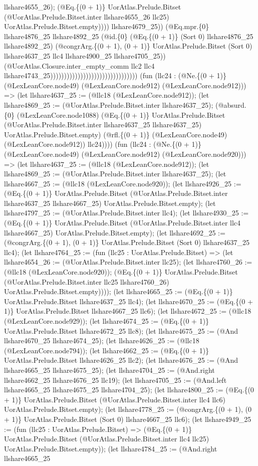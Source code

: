 \documentclass[11pt]{article}
\begin{document}
llshare4655\_26); (@Eq.\{(0 + 1)\} UorAtlas.Prelude.Bitset (@UorAtlas.Prelude.Bitset.inter llshare4655\_26 llc25) UorAtlas.Prelude.Bitset.empty)))) llshare4679\_25)) (@Eq.mpr.\{0\} llshare4876\_25 llshare4892\_25 (@id.\{0\} (@Eq.\{(0 + 1)\} (Sort 0) llshare4876\_25 llshare4892\_25) (@congrArg.\{(0 + 1), (0 + 1)\} UorAtlas.Prelude.Bitset (Sort 0) llshare4637\_25 llc4 llshare4900\_25 llshare4705\_25)) (@UorAtlas.Closure.inter\_empty\_comm llc2 llc4 llshare4743\_25)))))))))))))))))))))))))))))))) (fun (llc24 : (@Ne.\{(0 + 1)\} (@LexLeanCore.node49) (@LexLeanCore.node912) (@LexLeanCore.node912))) => (let llshare4637\_25 := (@llc18 (@LexLeanCore.node912)); (let llshare4869\_25 := (@UorAtlas.Prelude.Bitset.inter llshare4637\_25); (@absurd.\{0\} (@LexLeanCore.node1088) (@Eq.\{(0 + 1)\} UorAtlas.Prelude.Bitset (@UorAtlas.Prelude.Bitset.inter llshare4637\_25 llshare4637\_25) UorAtlas.Prelude.Bitset.empty) (@rfl.\{(0 + 1)\} (@LexLeanCore.node49) (@LexLeanCore.node912)) llc24)))) (fun (llc24 : (@Ne.\{(0 + 1)\} (@LexLeanCore.node49) (@LexLeanCore.node912) (@LexLeanCore.node920))) => (let llshare4637\_25 := (@llc18 (@LexLeanCore.node912)); (let llshare4869\_25 := (@UorAtlas.Prelude.Bitset.inter llshare4637\_25); (let llshare4667\_25 := (@llc18 (@LexLeanCore.node920)); (let llshare4926\_25 := (@Eq.\{(0 + 1)\} UorAtlas.Prelude.Bitset (@UorAtlas.Prelude.Bitset.inter llshare4637\_25 llshare4667\_25) UorAtlas.Prelude.Bitset.empty); (let llshare4797\_25 := (@UorAtlas.Prelude.Bitset.inter llc4); (let llshare4930\_25 := (@Eq.\{(0 + 1)\} UorAtlas.Prelude.Bitset (@UorAtlas.Prelude.Bitset.inter llc4 llshare4667\_25) UorAtlas.Prelude.Bitset.empty); (let llshare4692\_25 := (@congrArg.\{(0 + 1), (0 + 1)\} UorAtlas.Prelude.Bitset (Sort 0) llshare4637\_25 llc4); (let llshare4764\_25 := (fun (llc25 : UorAtlas.Prelude.Bitset) => (let llshare4654\_26 := (@UorAtlas.Prelude.Bitset.inter llc25); (let llshare4760\_26 := (@llc18 (@LexLeanCore.node920)); (@Eq.\{(0 + 1)\} UorAtlas.Prelude.Bitset (@UorAtlas.Prelude.Bitset.inter llc25 llshare4760\_26) UorAtlas.Prelude.Bitset.empty)))); (let llshare4665\_25 := (@Eq.\{(0 + 1)\} UorAtlas.Prelude.Bitset llshare4637\_25 llc4); (let llshare4670\_25 := (@Eq.\{(0 + 1)\} UorAtlas.Prelude.Bitset llshare4667\_25 llc6); (let llshare4672\_25 := (@llc18 (@LexLeanCore.node929)); (let llshare4674\_25 := (@Eq.\{(0 + 1)\} UorAtlas.Prelude.Bitset llshare4672\_25 llc8); (let llshare4675\_25 := (@And llshare4670\_25 llshare4674\_25); (let llshare4626\_25 := (@llc18 (@LexLeanCore.node794)); (let llshare4662\_25 := (@Eq.\{(0 + 1)\} UorAtlas.Prelude.Bitset llshare4626\_25 llc2); (let llshare4676\_25 := (@And llshare4665\_25 llshare4675\_25); (let llshare4704\_25 := (@And.right llshare4662\_25 llshare4676\_25 llc19); (let llshare4705\_25 := (@And.left llshare4665\_25 llshare4675\_25 llshare4704\_25); (let llshare4800\_25 := (@Eq.\{(0 + 1)\} UorAtlas.Prelude.Bitset (@UorAtlas.Prelude.Bitset.inter llc4 llc6) UorAtlas.Prelude.Bitset.empty); (let llshare4778\_25 := (@congrArg.\{(0 + 1), (0 + 1)\} UorAtlas.Prelude.Bitset (Sort 0) llshare4667\_25 llc6); (let llshare4949\_25 := (fun (llc25 : UorAtlas.Prelude.Bitset) => (@Eq.\{(0 + 1)\} UorAtlas.Prelude.Bitset (@UorAtlas.Prelude.Bitset.inter llc4 llc25) UorAtlas.Prelude.Bitset.empty)); (let llshare4784\_25 := (@And.right llshare4665\_25 
\end{document}
